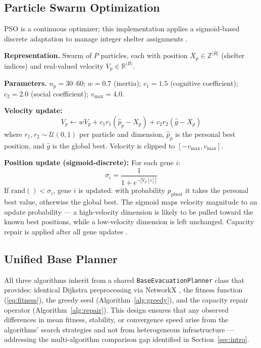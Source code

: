 \documentclass[journal]{IEEEtran}
\begin{document}
\subsection{Particle Swarm Optimization}
\label{sec:pso}

PSO is a continuous optimizer; this implementation applies a sigmoid-based discrete
adaptation to manage integer shelter assignments \cite{kennedy1995, shi1998}.

\textbf{Representation.} Swarm of $P$ particles, each with position
$X_p \in \mathbb{Z}^{|R|}$ (shelter indices) and real-valued velocity
$V_p \in \mathbb{R}^{|R|}$.

\textbf{Parameters.} $n_p = 30$--$60$; $w = 0.7$ (inertia); $c_1 = 1.5$
(cognitive coefficient); $c_2 = 2.0$ (social coefficient); $v_{\max} = 4.0$.

\textbf{Velocity update:}
\begin{equation}
  V_p \leftarrow w V_p + c_1 r_1 (\hat{p}_p - X_p) + c_2 r_2 (\hat{g} - X_p)
  \label{eq:pso_vel}
\end{equation}
where $r_1, r_2 \sim \mathcal{U}(0,1)$ per particle and dimension, $\hat{p}_p$ is the
personal best position, and $\hat{g}$ is the global best. Velocity is clipped to
$[-v_{\max}, v_{\max}]$.

\textbf{Position update (sigmoid-discrete):} For each gene $i$:
\begin{equation}
  \sigma_i = \frac{1}{1 + e^{-|V_p[i]|}}
  \label{eq:sigmoid}
\end{equation}
If $\text{rand}() < \sigma_i$, gene $i$ is updated: with probability $p_{\text{pbest}}$ it
takes the personal best value, otherwise the global best. The sigmoid maps velocity magnitude
to an update probability — a high-velocity dimension is likely to be pulled toward the known
best positions, while a low-velocity dimension is left unchanged. Capacity repair is applied
after all gene updates \cite{nirwana2024intelligent}.

\subsection{Unified Base Planner}

All three algorithms inherit from a shared \texttt{BaseEvacuationPlanner} class that provides:
identical Dijkstra preprocessing via NetworkX \cite{hagberg2008}, the fitness function
(\ref{eq:fitness}), the greedy seed (Algorithm~\ref{alg:greedy}), and the capacity repair
operator (Algorithm~\ref{alg:repair}). This design ensures that any observed differences in
mean fitness, stability, or convergence speed arise from the algorithms' search strategies
and not from heterogeneous infrastructure — addressing the multi-algorithm comparison gap
identified in Section~\ref{sec:intro}.
\end{document}

